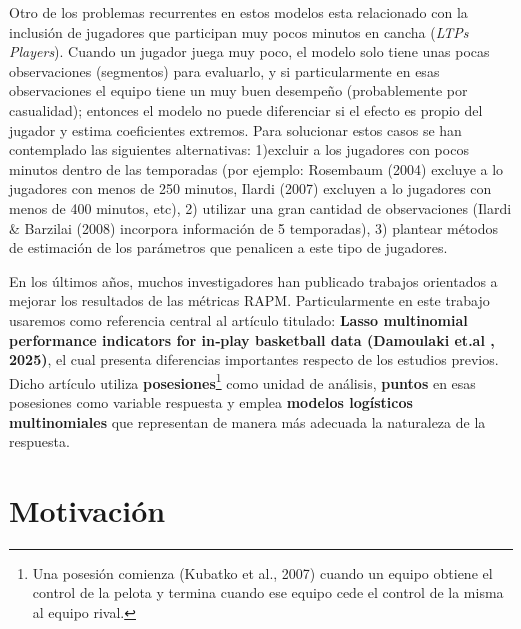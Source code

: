 \documentclass[
]{article}
\begin{document}
Otro de los problemas recurrentes en estos modelos esta relacionado con
la inclusión de jugadores que participan muy pocos minutos en cancha
(\emph{LTPs Players}). Cuando un jugador juega muy poco, el modelo solo
tiene unas pocas observaciones (segmentos) para evaluarlo, y si
particularmente en esas observaciones el equipo tiene un muy buen
desempeño (probablemente por casualidad); entonces el modelo no puede
diferenciar si el efecto es propio del jugador y estima coeficientes
extremos. Para solucionar estos casos se han contemplado las siguientes
alternativas: 1)excluir a los jugadores con pocos minutos dentro de las
temporadas (por ejemplo: Rosembaum (2004) excluye a lo jugadores con
menos de 250 minutos, Ilardi (2007) excluyen a lo jugadores con menos de
400 minutos, etc), 2) utilizar una gran cantidad de observaciones
(Ilardi \& Barzilai (2008) incorpora información de 5 temporadas), 3)
plantear métodos de estimación de los parámetros que penalicen a este
tipo de jugadores.

En los últimos años, muchos investigadores han publicado trabajos
orientados a mejorar los resultados de las métricas RAPM.
Particularmente en este trabajo usaremos como referencia central al
artículo titulado: \textbf{Lasso multinomial performance indicators for
in‑play basketball data (Damoulaki et.al , 2025)}, el cual presenta
diferencias importantes respecto de los estudios previos. Dicho artículo
utiliza \textbf{posesiones}\footnote{Una posesión comienza (Kubatko et
  al., 2007) cuando un equipo obtiene el control de la pelota y termina
  cuando ese equipo cede el control de la misma al equipo rival.} como
unidad de análisis, \textbf{puntos} en esas posesiones como variable
respuesta y emplea \textbf{modelos logísticos multinomiales} que
representan de manera más adecuada la naturaleza de la respuesta.

\section{Motivación}\label{motivaciuxf3n}
\end{document}
